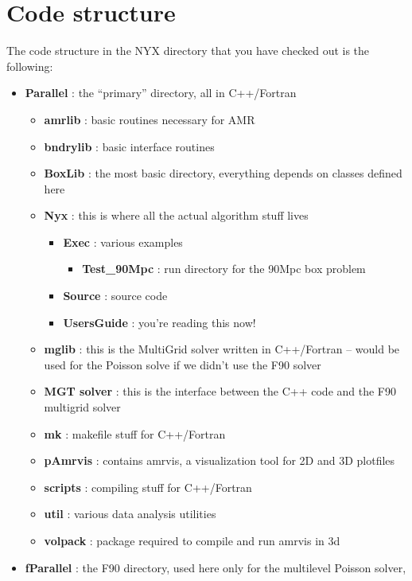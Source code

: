 \section{Code structure}
The code structure in the NYX directory that you have checked out is the following:

\begin{itemize}
\item {\bf Parallel}   : the ``primary'' directory, all in C++/Fortran 
  \begin{itemize}
  \item {\bf amrlib}   : basic routines necessary for AMR 
  \item {\bf bndrylib} : basic interface routines
  \item {\bf BoxLib}   : the most basic directory, everything depends on classes defined here
  \item {\bf Nyx}   : this is where all the actual algorithm stuff lives
  \begin{itemize}
    \item {\bf Exec}       : various examples
    \begin{itemize}
      \item {\bf Test\_90Mpc}  : run directory for the 90Mpc box problem
    \end{itemize}
    \item {\bf Source}     : source code
    \item {\bf UsersGuide} : you're reading this now!
  \end{itemize}
  \item {\bf mglib}      : this is the MultiGrid solver written in C++/Fortran -- would be 
                           used for the Poisson solve if we didn't use the F90 solver
  \item {\bf MGT solver} : this is the interface between the C++ code and the F90 
                           multigrid solver
  \item {\bf mk}         : makefile stuff  for C++/Fortran
  \item {\bf pAmrvis}    : contains amrvis, a visualization tool for 2D and 3D plotfiles
  \item {\bf scripts}    : compiling stuff for C++/Fortran
  \item {\bf util}       : various data analysis utilities
  \item {\bf volpack}    : package required to compile and run amrvis in 3d
  \end{itemize}
\item {\bf fParallel} : the F90 directory, used here only for the multilevel Poisson solver,

\end{itemize}
